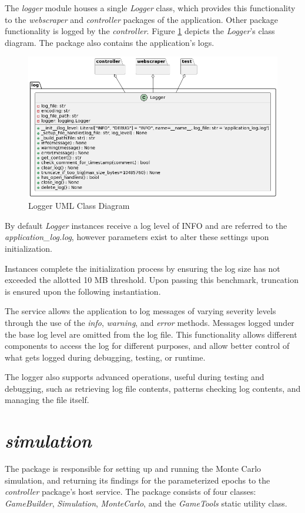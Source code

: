\documentclass{thesis-ekf}
\theoremstyle{definition}
\theoremstyle{remark}
\begin{document}
The \emph{logger} module houses a single \emph{Logger} class, which provides this functionality to the \emph{webscraper} and \emph{controller} packages of the application. Other package functionality is logged by the \emph{controller}. Figure \ref{img-logger-class} depicts the \emph{Logger}'s class diagram. The package also contains the application's logs.

\begin{figure}[th!]
	\centering
	\includegraphics[width=0.8\linewidth]{img/class/logger}
	\caption{Logger UML Class Diagram}
	\label{img-logger-class}
\end{figure}

By default \emph{Logger} instances receive a log level of INFO and are referred to the \emph{application\_log.log}, however parameters exist to alter these settings upon initialization. 

Instances complete the initialization process by ensuring the log size has not exceeded the allotted 10 MB threshold. Upon passing this benchmark, truncation is ensured upon the following instantiation.

The service allows the application to log messages of varying severity levels through the use of the \emph{info}, \emph{warning}, and \emph{error} methods. Messages logged under the base log level are omitted from the log file. This functionality allows different components to access the log for different purposes, and allow better control of what gets logged during debugging, testing, or runtime.

The logger also supports advanced operations, useful during testing and debugging, such as retrieving log file contents, patterns checking log contents, and managing the file itself.


\section{\emph{simulation}} \label{sec-simulation}
The package is responsible for setting up and running the Monte Carlo simulation, and returning its findings for the parameterized epochs to the \emph{controller} package's host service. The package consists of four classes: \emph{GameBuilder}, \emph{Simulation}, \emph{MonteCarlo}, and the \emph{GameTools} static utility class.
\end{document}
